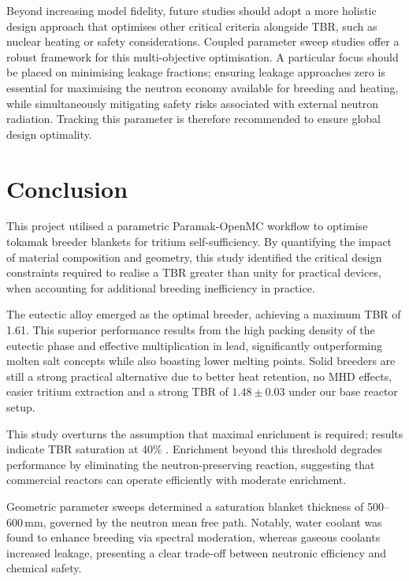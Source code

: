 \documentclass[12pt]{article}
\begin{document}
Beyond increasing model fidelity, future studies should adopt a more holistic design approach that
optimises other critical criteria alongside TBR, such as nuclear heating or safety considerations.
Coupled parameter sweep studies offer a robust framework for this multi-objective optimisation. A
particular focus should be placed on minimising leakage fractions; ensuring leakage
approaches zero is essential for maximising the neutron economy available for breeding and heating,
while simultaneously mitigating safety risks associated with external neutron radiation. Tracking
this parameter is therefore recommended to ensure global design optimality.



\section{Conclusion}
\label{sec:conclusion}

This project utilised a parametric Paramak-OpenMC workflow to optimise tokamak breeder blankets for
tritium self-sufficiency. By quantifying the impact of material composition and geometry, this study
identified the critical design constraints required to realise a TBR greater than unity for
practical devices, when accounting for additional breeding inefficiency in practice.

The eutectic alloy  emerged as the optimal breeder, achieving a maximum TBR of 1.61.
This superior performance results from the high packing density of the eutectic phase and effective
 multiplication in lead, significantly outperforming molten salt concepts while also
boasting lower melting points. Solid breeders are still a strong practical alternative due to better
heat retention, no MHD effects, easier tritium extraction and a strong TBR of $1.48 \pm 0.03$ under
our base reactor setup.

This study overturns the assumption that maximal enrichment is required; results indicate
TBR saturation at 40\% . Enrichment beyond this threshold degrades performance by
eliminating the neutron-preserving  reaction, suggesting that
commercial reactors can operate efficiently with moderate enrichment.

Geometric parameter sweeps determined a saturation blanket thickness of 500--600\,mm, governed by
the neutron mean free path. Notably, water coolant was found to enhance breeding via spectral
moderation, whereas gaseous coolants increased leakage, presenting a clear trade-off between
neutronic efficiency and chemical safety.
\end{document}
